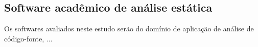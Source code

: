 %
%
%
%

\subsection{Software acadêmico de análise estática}

Os softwares avaliados neste estudo serão do domínio de aplicação de análise de
código-fonte, ...
